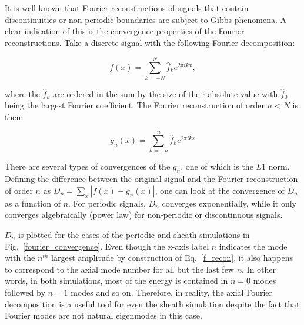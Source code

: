 \documentclass[showpacs,preprintnumbers,amsmath,amssymb,superscriptaddress,aip]{revtex4-1}
\def\beq{\begin{equation}}
\def\eeq{\end{equation}}
\begin{document}
It is well known that Fourier reconstructions of signals that contain discontinuities or non-periodic boundaries are subject to Gibbs phenomena. A clear indication of this is the
convergence properties of the Fourier reconstructions. Take a discrete signal with the following Fourier decomposition:

\beq
\label{f_decomp}
f(x) = \sum_{k=-N}^{N} \hat{f}_k e^{2 \pi i k x},
\eeq

where the $\hat{f}_k$ are ordered in the sum by the size of their absolute value with $\hat{f}_0$ being the largest Fourier coefficient. The Fourier reconstruction of order $n<N$ is then:

\beq
\label{f_recon}
g_n(x) = \sum_{k=-n}^{n} \hat{f}_k e^{2 \pi i k x}
\eeq

There are several types of convergences of the $g_n$, one of which is the $L1$ norm. Defining the difference between the original signal and the Fourier reconstruction of order $n$ as
$D_n = \sum_x |f(x) - g_n(x)|$, one can look at the convergence of $D_n$ as a function of $n$. For periodic signals, $D_n$ converges exponentially, while it only converges algebraically
(power law) for non-periodic or discontinuous signals. 

$D_n$ is plotted for the cases of the periodic and sheath simulations in Fig.~\ref{fourier_convergence}. Even though the x-axis label $n$ indicates the mode with the $n^{th}$ largest amplitude
by construction of Eq.~\ref{f_recon}, it also happens to correspond to the axial mode number for all but the last few $n$. In other words, in both simulations, most of the energy is contained
in $n=0$ modes followed by $n=1$ modes and so on. Therefore, in reality, the axial Fourier decomposition is a useful tool for even the sheath simulation despite the fact that Fourier
modes are not natural eigenmodes in this case.




\end{document}
